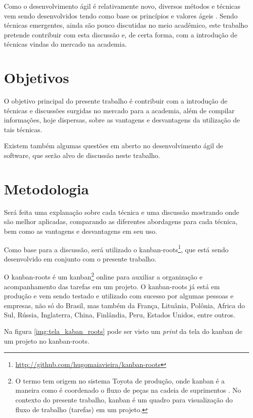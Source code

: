 Como o desenvolvimento ágil é relativamente novo, diversos métodos e técnicas vem sendo desenvolvidos tendo como base os princípios e valores ágeis \cite{BDDRodrigo}. Sendo técnicas emergentes, ainda são pouco discutidas no meio acadêmico, este trabalho pretende contribuir com esta discussão e, de certa forma, com a introdução de técnicas vindas do mercado na academia.


\section{Objetivos}

O objetivo principal do presente trabalho é contribuir com a introdução de técnicas e discussões surgidas no mercado para a academia, além de compilar informações, hoje dispersas, sobre as vantagens e desvantagens da utilização de tais técnicas.

Existem também algumas questões em aberto no desenvolvimento ágil de software, que serão alvo de discussão neste trabalho.

\section{Metodologia}

Será feita uma explanação sobre cada técnica e uma discussão mostrando onde são melhor aplicadas, comparando as diferentes abordagens para cada técnica, bem como as vantagens e desvantagens em seu uso.

Como base para a discussão, será utilizado o kanban-roots\footnote{\url{http://github.com/hugomaiavieira/kanban-roots}}, que está sendo desenvolvido em conjunto com o presente trabalho.

O kanban-roots é um kanban\footnote{O termo tem origem no sistema Toyota de produção, onde kanban é a maneira como é coordenado o fluxo de peças na cadeia de suprimentos  \cite{AMaquinaQueMudouOMundo}. No contexto do presente trabalho, kanban é um quadro para visualização do fluxo de trabalho (tarefas) em um projeto.} online para auxiliar a organização e acompanhamento das tarefas em um projeto. O kanban-roots já está em produção e vem sendo testado e utilizado com sucesso por algumas pessoas e empresas, não só do Brasil, mas também da França, Lituânia, Polônia, Africa do Sul, Rússia, Inglaterra, China, Finlândia, Peru, Estados Unidos, entre outros.

Na figura \ref{img:tela_kaban_roots} pode ser visto um \textit{print} da tela do kanban de um projeto no kanban-roots.

